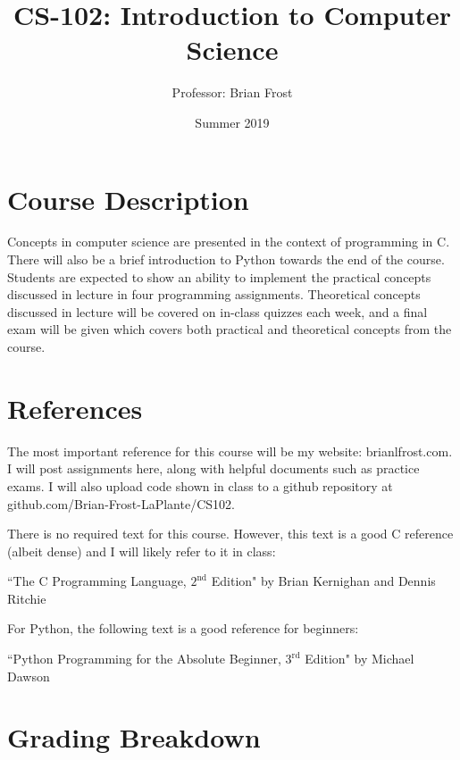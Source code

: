 \documentclass{article}
\title{CS-102: Introduction to Computer Science}
\author{Professor: Brian Frost}
\date{Summer 2019}
\begin{document}
\maketitle

\section*{Course Description}

Concepts in computer science are presented in the context of programming in C. There will also be a brief introduction to Python towards the end of the course. Students are expected to show an ability to implement the practical concepts discussed in lecture in four programming assignments. Theoretical concepts discussed in lecture will be covered on in-class quizzes each week, and a final exam will be given which covers both practical and theoretical concepts from the course.

\section*{References}

The most important reference for this course will be my website: brianlfrost.com. I will post assignments here, along with helpful documents such as practice exams. I will also upload code shown in class to a github repository at github.com/Brian-Frost-LaPlante/CS102.

There is no required text for this course. However, this text is a good C reference (albeit dense) and I will likely refer to it in class:

``The C Programming Language, $2^{\text{nd}}$ Edition" by Brian Kernighan and Dennis Ritchie

\noindent For Python, the following text is a good reference for beginners:

``Python Programming for the Absolute Beginner, $3^{\text{rd}}$ Edition" by Michael Dawson

\section*{Grading Breakdown}
\end{document}
